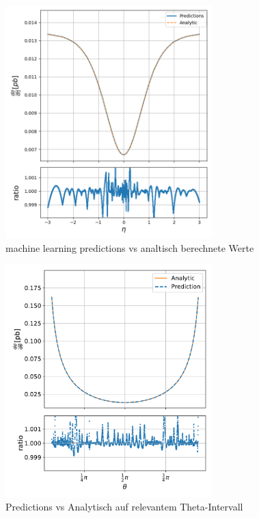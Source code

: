 \begin{figure}[tbp]
	\centering
	\includegraphics[width=8cm]{graphics/partonic_eta_model_eta_ratio}
	\caption{machine learning predictions vs analtisch berechnete Werte}
	\label{partonic_eta_model}
\end{figure}

\begin{figure}[tbp]
	\centering
	\includegraphics[width=8cm]{graphics/2}
	\caption{Predictions vs Analytisch auf relevantem Theta-Intervall}
\end{figure}

